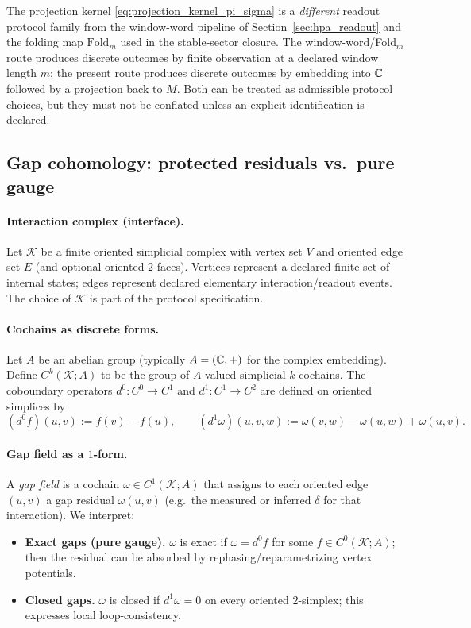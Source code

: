 \begin{remark}
\AuditTag The projection kernel \eqref{eq:projection_kernel_pi_sigma} is a \emph{different} readout protocol family from the window-word pipeline of Section~\ref{sec:hpa_readout} and the folding map $\mathrm{Fold}_m$ used in the stable-sector closure.
The window-word/Fold$_m$ route produces discrete outcomes by finite observation at a declared window length $m$; the present route produces discrete outcomes by embedding into $\mathbb{C}$ followed by a projection back to $M$.
Both can be treated as admissible protocol choices, but they must not be conflated unless an explicit \MatchTag identification is declared.
\end{remark}

\subsection{Gap cohomology: protected residuals vs.\ pure gauge}
\label{subsec:gap_cohomology}

\paragraph{Interaction complex (interface).}
\InterfaceTag Let $\mathcal{K}$ be a finite oriented simplicial complex with vertex set $V$ and oriented edge set $E$ (and optional oriented $2$-faces).
Vertices represent a declared finite set of internal states; edges represent declared elementary interaction/readout events.
The choice of $\mathcal{K}$ is part of the protocol specification.

\paragraph{Cochains as discrete forms.}
\InterfaceTag Let $A$ be an abelian group (typically $A=(\mathbb{C},+)$ for the complex embedding).
Define $C^k(\mathcal{K};A)$ to be the group of $A$-valued simplicial $k$-cochains.
The coboundary operators $d^0:C^0\to C^1$ and $d^1:C^1\to C^2$ are defined on oriented simplices by
\[
(d^0 f)(u,v):=f(v)-f(u),
\qquad
(d^1\omega)(u,v,w):=\omega(v,w)-\omega(u,w)+\omega(u,v).
\]

\paragraph{Gap field as a $1$-form.}
\InterfaceTag A \emph{gap field} is a cochain $\omega\in C^1(\mathcal{K};A)$ that assigns to each oriented edge $(u,v)$ a gap residual $\omega(u,v)$ (e.g.\ the measured or inferred $\delta$ for that interaction).
We interpret:
\begin{itemize}
\item \textbf{Exact gaps (pure gauge).} $\omega$ is exact if $\omega=d^0 f$ for some $f\in C^0(\mathcal{K};A)$; then the residual can be absorbed by rephasing/reparametrizing vertex potentials.
\item \textbf{Closed gaps.} $\omega$ is closed if $d^1\omega=0$ on every oriented $2$-simplex; this expresses local loop-consistency.
\end{itemize}

